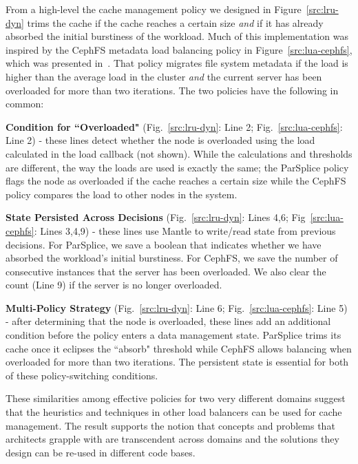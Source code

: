 From a high-level the cache management policy we designed in
Figure~\ref{src:lru-dyn} trims the cache if the cache reaches a certain size
{\it and} if it has already absorbed the initial burstiness of the workload.
Much of this implementation was inspired by the CephFS metadata load
balancing policy in Figure~\ref{src:lua-cephfs}, which was presented
in~\cite{sevilla:sc15-mantle}. That policy migrates file system metadata if the
load is higher than the average load in the cluster {\it and} the current
server has been overloaded for more than two iterations. The two policies have
the following in common:

\textbf{Condition for ``Overloaded"} (Fig.~\ref{src:lru-dyn}: Line 2;
Fig.~\ref{src:lua-cephfs}: Line 2) - these lines detect whether the node is
overloaded using the load calculated in the load callback (not shown). While
the calculations and thresholds are different, the way the loads are used is
exactly the same; the ParSplice policy flags the node as overloaded if the
cache reaches a certain size while the CephFS policy compares the load to other
nodes in the system.

\textbf{State Persisted Across Decisions} (Fig.~\ref{src:lru-dyn}: Lines 4,6;
Fig~\ref{src:lua-cephfs}: Lines 3,4,9) - these lines use Mantle to write/read state
from previous decisions.  For ParSplice, we save a boolean that indicates
whether we have absorbed the workload's initial burstiness. For CephFS, we save
the number of consecutive instances that the server has been overloaded. We
also clear the count (Line 9) if the server is no longer overloaded. 

\textbf{Multi-Policy Strategy} (Fig.~\ref{src:lru-dyn}: Line 6;
Fig.~\ref{src:lua-cephfs}: Line 5) - after determining that the node is
overloaded, these lines add an additional condition before the policy enters a
data management state.  ParSplice trims its cache once it eclipses the
``absorb" threshold while CephFS allows balancing when overloaded for more than
two iterations. The persistent state is essential for both of these
policy-switching conditions.

These similarities among effective policies for two very different domains
suggest that the heuristics and techniques in other load balancers can be used
for cache management. The result supports the notion that concepts and problems
that architects grapple with are transcendent across domains and the solutions
they design can be re-used in different code bases.

